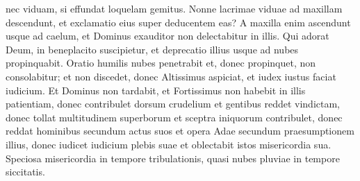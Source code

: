 \begin{biblechapter}
\begin{biblechapter}
\begin{biblechapter}
\begin{biblechapter}
\begin{biblechapter}
\begin{biblechapter}
\begin{biblechapter}
\begin{biblechapter}
\begin{biblechapter}
\begin{biblechapter}
\begin{biblechapter}
\begin{biblechapter}
\begin{biblechapter}
\begin{biblechapter}
\begin{biblechapter}
\begin{biblechapter}
\begin{biblechapter}
\begin{biblechapter}
\begin{biblechapter}
\begin{biblechapter}
\begin{biblechapter}
\begin{biblechapter}
\begin{biblechapter}
\begin{biblechapter}
\begin{biblechapter}
\begin{biblechapter}
\begin{biblechapter}
\begin{biblechapter}
\begin{biblechapter}
\begin{biblechapter}
\begin{biblechapter}
\begin{biblechapter}
\begin{biblechapter}
\begin{biblechapter}
\begin{biblechapter}
 nec viduam, si effundat loquelam gemitus.
 \verse Nonne lacrimae viduae ad maxillam descendunt,
 et exclamatio eius super deducentem eas?
 \verse A maxilla enim ascendunt usque ad caelum,
 et Dominus exauditor non delectabitur in illis.
 \verse Qui adorat Deum, in beneplacito suscipietur,
 et deprecatio illius usque ad nubes propinquabit.
 \verse Oratio humilis nubes penetrabit
 et, donec propinquet, non consolabitur;
 et non discedet, donec Altissimus aspiciat,
 et iudex iustus faciat iudicium.
 \verse Et Dominus non tardabit,
 et Fortissimus non habebit in illis patientiam,
 donec contribulet dorsum crudelium
 \verse et gentibus reddet vindictam,
 donec tollat multitudinem superborum
 et sceptra iniquorum contribulet,
 \verse donec reddat hominibus secundum actus suos
 et opera Adae secundum praesumptionem illius,
 \verse donec iudicet iudicium plebis suae
 et oblectabit istos misericordia sua.
 \verse Speciosa misericordia in tempore tribulationis,
 quasi nubes pluviae in tempore siccitatis.
 

\end{biblechapter}
\end{biblechapter}
\end{biblechapter}
\end{biblechapter}
\end{biblechapter}
\end{biblechapter}
\end{biblechapter}
\end{biblechapter}
\end{biblechapter}
\end{biblechapter}
\end{biblechapter}
\end{biblechapter}
\end{biblechapter}
\end{biblechapter}
\end{biblechapter}
\end{biblechapter}
\end{biblechapter}
\end{biblechapter}
\end{biblechapter}
\end{biblechapter}
\end{biblechapter}
\end{biblechapter}
\end{biblechapter}
\end{biblechapter}
\end{biblechapter}
\end{biblechapter}
\end{biblechapter}
\end{biblechapter}
\end{biblechapter}
\end{biblechapter}
\end{biblechapter}
\end{biblechapter}
\end{biblechapter}
\end{biblechapter}
\end{biblechapter}
